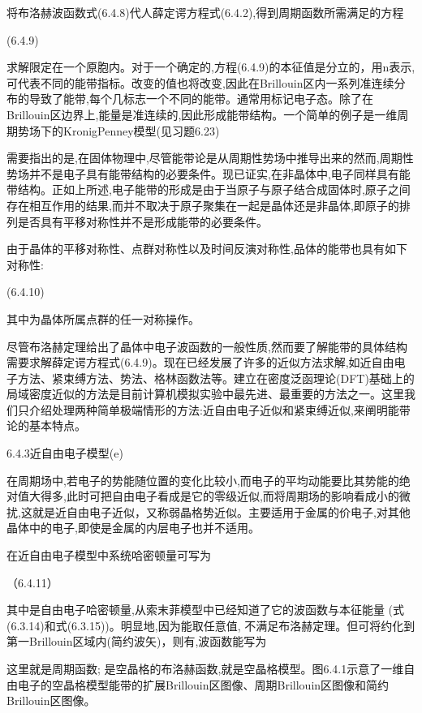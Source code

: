 将布洛赫波函数式(6.4.8)代人薛定谔方程式(6.4.2),得到周期函数所需满足的方程

 	(6.4.9)

求解限定在一个原胞内。对于一个确定的,方程(6.4.9)的本征值是分立的，用n表示,可代表不同的能带指标。改变的值也将改变,因此在Brillouin区内一系列准连续分布的导致了能带,每个几标志一个不同的能带。通常用标记电子态。除了在Brillouin区边界上,能量是准连续的,因此形成能带结构。一个简单的例子是一维周期势场下的KronigPenney模型(见习题6.23)

需要指出的是,在固体物理中,尽管能带论是从周期性势场中推导出来的然而,周期性势场并不是电子具有能带结构的必要条件。现已证实,在非晶体中,电子同样具有能带结构。正如上所述,电子能带的形成是由于当原子与原子结合成固体时,原子之间存在相互作用的结果,而并不取决于原子聚集在一起是晶体还是非晶体,即原子的排列是否具有平移对称性并不是形成能带的必要条件。

由于晶体的平移对称性、点群对称性以及时间反演对称性,品体的能带也具有如下对称性:

	(6.4.10)

其中为晶体所属点群的任一对称操作。

尽管布洛赫定理给出了晶体中电子波函数的一般性质,然而要了解能带的具体结构需要求解薛定谔方程式(6.4.9)。现在已经发展了许多的近似方法求解,如近自由电子方法、紧束缚方法、势法、格林函数法等。建立在密度泛函理论(DFT)基础上的局域密度近似的方法是目前计算机模拟实验中最先进、最重要的方法之一。这里我们只介绍处理两种简单极端情形的方法:近自由电子近似和紧束缚近似,来阐明能带论的基本特点。

6.4.3近自由电子模型(e)

在周期场中,若电子的势能随位置的变化比较小,而电子的平均动能要比其势能的绝对值大得多,此时可把自由电子看成是它的零级近似,而将周期场的影响看成小的微扰,这就是近自由电子近似，又称弱晶格势近似。主要适用于金属的价电子,对其他晶体中的电子,即使是金属的内层电子也并不适用。

在近自由电子模型中系统哈密顿量可写为

	（6.4.11）

	其中是自由电子哈密顿量,从索末菲模型中已经知道了它的波函数与本征能量 (式(6.3.14)和式(6.3.15))。明显地,因为能取任意值, 不满足布洛赫定理。但可将约化到第一Brillouin区域内(简约波矢)，则有,波函数能写为



这里就是周期函数; 是空晶格的布洛赫函数,就是空晶格模型。图6.4.1示意了一维自由电子的空晶格模型能带的扩展Brillouin区图像、周期Brillouin区图像和简约Brillouin区图像。






